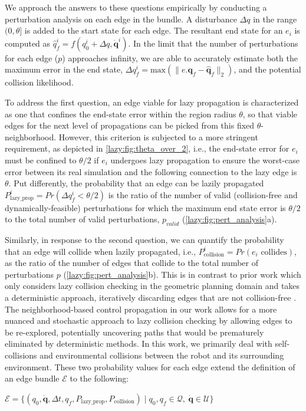 We approach the answers to these questions empirically by conducting a perturbation analysis on each edge in the bundle. A disturbance $\Delta q$ in the range $(0, \theta]$ is added to the start state for each edge. The resultant end state for an $e_i$ is computed as $\hat{q}_f^i = f(q_0^i + \Delta q, \boldsymbol{\dot{q}}^i)$. In the limit that the number of perturbations for each edge ($p$) approaches infinity, we are able to accurately estimate both the maximum error in the end state, $\Delta q_f^i = \text{max}(\|e.\boldsymbol{q}_f - \hat{\boldsymbol{q}}_f\|_2)$, and the potential collision likelihood.

To address the first question, an edge viable for lazy propagation is characterized as one that confines the end-state error within the region radius $\theta$, so that viable edges for the next level of propagations can be picked from this fixed $\theta$-neighborhood.
However, this criterion is subjected to a more stringent requirement, as depicted in \cref{lazy:fig:theta_over_2}, i.e., the end-state error for $e_i$ must be confined to $\theta / 2$ if $e_i$ undergoes lazy propagation to ensure the worst-case error between its real simulation and the following connection to the lazy edge is $\theta$.
Put differently, the probability that an edge can be lazily propagated $P_{\text{lazy\_prop}}^i = Pr(\Delta q_f^i < \theta / 2)$ is the ratio of the number of valid (collision-free and dynamically-feasible) perturbations for which the maximum end state error is $\theta / 2$ to the total number of valid perturbations, $p_{valid}$ (\cref{lazy:fig:pert_analysis}a).

Similarly, in response to the second question, we can quantify the probability that an edge will collide when lazily propagated, i.e., $P_{\text{collision}}^i = Pr(e_i \text{ collides})$, as the ratio of the number of edges that collide to the total number of perturbations $p$ (\cref{lazy:fig:pert_analysis}b). This is in contrast to prior work which only considers lazy collision checking in the geometric planning domain and takes a deterministic approach, iteratively discarding edges that are not collision-free \cite{kavraki2000path,hauser2015lazy}. The neighborhood-based control propagation in our work allows for a more nuanced and stochastic approach to lazy collision checking by allowing edges to be re-explored, potentially uncovering paths that would be prematurely eliminated by deterministic methods. In this work, we primarily deal with self-collisions and environmental collisions between the robot and its surrounding environment.
These two probability values for each edge extend the definition of an edge bundle $\mathcal{E}$ to the following:
\begin{center}
$\mathcal{E} = \{(q_0, \boldsymbol{\dot{q}}, \Delta t, q_f, P_{\text{lazy\_prop}}, P_{\text{collision}}) \mid q_0, q_f \in \mathcal{Q}, \hspace{3pt} \boldsymbol{\dot{q}} \in \mathcal{U}\}$
\end{center}

